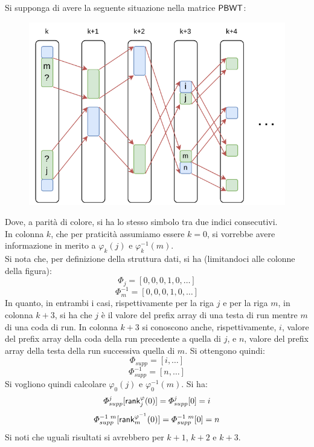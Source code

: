 \begin{esempio}
  Si supponga di avere la seguente situazione nella matrice $\mbox{\rm {\sf PBWT}}$:
  \begin{figure}[H]
    \centering
    \includegraphics[scale = 0.8]{img/phi.pdf}   
  \end{figure}
  \noindent
  Dove, a parità di colore, si ha lo stesso simbolo tra due indici
  consecutivi. \\
  In colonna $k$, che per praticità assumiamo essere $k=0$, si vorrebbe avere
  informazione in merito a $\varphi_k(j)$ e $\varphi^{-1}_k(m)$. \\
  Si nota che, per definizione della struttura dati, si ha (limitandoci alle
  colonne della figura):
  \[\varPhi_j=[0,0,0,1,0, \ldots]\]
  \[\varPhi^{-1}_m=[0,0,0,1,0,\ldots]\]
  In quanto, in entrambi i casi, rispettivamente per la riga $j$ e per la riga
  $m$, 
  in colonna $k+3$, si ha che $j$ è il valore del prefix array di una testa di
  run 
  mentre $m$ di una coda di run. In colonna $k+3$ si conoscono anche,
  rispettivamente, $i$, valore del prefix array della coda della run precedente
  a quella di $j$, e $n$, valore del prefix array della testa della run
  successiva quella di $m$. Si ottengono quindi:
  \[\varPhi_{supp}=[i,\ldots]\]
  \[\varPhi^{-1}_{supp}=[n,\ldots]\]
  Si vogliono quindi calcolare $\varphi_0(j)$ e  $\varphi^{-1}_0(m)$. Si ha:
  \[\varPhi_{supp}^j[\mbox{\rm {\sf rank}}^\varphi_j(0)]=\varPhi_{supp}^j[0]=i\]
  \[\varPhi^{-1\,\,m}_{supp}[\mbox{\rm {\sf rank}}^{\varphi^{-1}}_m(0)]=\varPhi^{-1\,\,m}_{supp}[0]=n\]
  Si noti che uguali risultati si avrebbero per $k+1$, $k+2$ e $k+3$.
\end{esempio}
